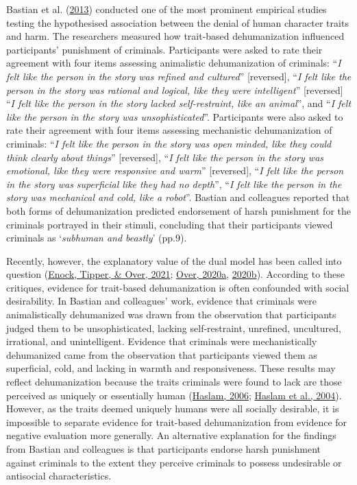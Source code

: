 \documentclass[
]{article}
\begin{document}
Bastian et al. (\protect\hyperlink{ref-Bastian2013}{2013}) conducted one of the most prominent empirical studies testing the hypothesised association between the denial of human character traits and harm. The researchers measured how trait-based dehumanization influenced participants' punishment of criminals. Participants were asked to rate their agreement with four items assessing animalistic dehumanization of criminals: ``\emph{I felt like the person in the story was refined and cultured}'' {[}reversed{]}, ``\emph{I felt like the person in the story was rational and logical, like they were intelligent}'' {[}reversed{]} ``\emph{I felt like the person in the story lacked self-restraint, like an animal}'', and ``\emph{I felt like the person in the story was unsophisticated}''. Participants were also asked to rate their agreement with four items assessing mechanistic dehumanization of criminals: ``\emph{I felt like the person in the story was open minded, like they could think clearly about things}'' {[}reversed{]}, ``\emph{I felt like the person in the story was emotional, like they were responsive and warm}'' {[}reversed{]}, ``\emph{I felt like the person in the story was superficial like they had no depth}'', ``\emph{I felt like the person in the story was mechanical and cold, like a robot}''. Bastian and colleagues reported that both forms of dehumanization predicted endorsement of harsh punishment for the criminals portrayed in their stimuli, concluding that their participants viewed criminals as `\emph{subhuman and beastly}' (pp.9).

Recently, however, the explanatory value of the dual model has been called into question (\protect\hyperlink{ref-Enock2021a}{Enock, Tipper, \& Over, 2021}; \protect\hyperlink{ref-Over2020a}{Over, 2020a}, \protect\hyperlink{ref-Over2020b}{2020b}). According to these critiques, evidence for trait-based dehumanization is often confounded with social desirability. In Bastian and colleagues' work, evidence that criminals were animalistically dehumanized was drawn from the observation that participants judged them to be unsophisticated, lacking self-restraint, unrefined, uncultured, irrational, and unintelligent. Evidence that criminals were mechanistically dehumanized came from the observation that participants viewed them as superficial, cold, and lacking in warmth and responsiveness. These results may reflect dehumanization because the traits criminals were found to lack are those perceived as uniquely or essentially human (\protect\hyperlink{ref-Haslam2006}{Haslam, 2006}; \protect\hyperlink{ref-Haslam2004}{Haslam et al., 2004}). However, as the traits deemed uniquely humans were all socially desirable, it is impossible to separate evidence for trait-based dehumanization from evidence for negative evaluation more generally. An alternative explanation for the findings from Bastian and colleagues is that participants endorse harsh punishment against criminals to the extent they perceive criminals to possess undesirable or antisocial characteristics.
\end{document}
